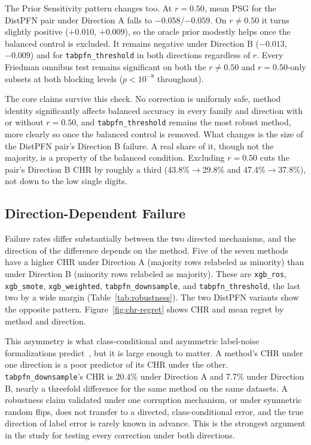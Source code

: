 The Prior Sensitivity pattern changes too. At $r{=}0.50$, mean PSG for the DistPFN
pair under Direction A falls to $-0.058$/$-0.059$. On $r{\neq}0.50$ it turns
slightly positive ($+0.010$, $+0.009$), so the oracle prior modestly helps once
the balanced control is excluded. It remains negative under Direction B
($-0.013$, $-0.009$) and for \texttt{tabpfn\_threshold} in both directions
regardless of $r$. Every Friedman omnibus test remains significant on both the
$r{\neq}0.50$ and $r{=}0.50$-only subsets at both blocking levels ($p<10^{-8}$
throughout).

The core claims survive this check. No correction is uniformly safe, method
identity significantly affects balanced accuracy in every family and direction
with or without $r{=}0.50$, and \texttt{tabpfn\_threshold} remains the most robust
method, more clearly so once the balanced control is removed. What changes is the
size of the DistPFN pair's Direction B failure. A real share of it, though not
the majority, is a property of the balanced condition. Excluding $r{=}0.50$ cuts
the pair's Direction B CHR by roughly a third (43.8\%$\to$29.8\% and
47.4\%$\to$37.8\%), not down to the low single digits.

\subsection{Direction-Dependent Failure}
\label{sec:results-rq2}
\label{sec:discussion-direction}

Failure rates differ substantially between the two directed mechanisms, and the
direction of the difference depends on the method. Five of the seven methods have
a higher CHR under Direction A (majority rows relabeled as minority) than under
Direction B (minority rows relabeled as majority). These are \texttt{xgb\_ros},
\texttt{xgb\_smote}, \texttt{xgb\_weighted}, \texttt{tabpfn\_downsample}, and
\texttt{tabpfn\_threshold}, the last two by a wide margin
(Table~\ref{tab:robustness}). The two DistPFN variants show the opposite pattern.
Figure~\ref{fig:chr-regret} shows CHR and mean regret by method and direction.

This asymmetry is what class-conditional and asymmetric label-noise formalizations
predict~\cite{natarajan2013noisylabels,scott2013asymmetricnoise}, but it is large
enough to matter. A method's CHR under one direction is a poor predictor of its
CHR under the other. \texttt{tabpfn\_downsample}'s CHR is 20.4\% under Direction A
and 7.7\% under Direction B, nearly a threefold difference for the same method on
the same datasets. A robustness claim validated under one corruption mechanism, or
under symmetric random flips, does not transfer to a directed, class-conditional
error, and the true direction of label error is rarely known in advance. This is
the strongest argument in the study for testing every correction under both
directions.


